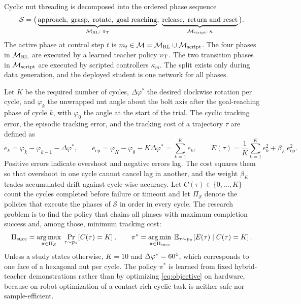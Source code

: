 Cyclic nut threading is decomposed into the ordered phase sequence
\begin{equation}\label{eq:phases}
  \mathcal{S}=\big(\underbrace{\text{approach},\;\text{grasp},\;\text{rotate},\;\text{goal reaching}}_{\mathcal{M}_{\mathrm{RL}}:\;\pi_{\mathrm{T}}},\;\underbrace{\text{release},\;\text{return and reset}}_{\mathcal{M}_{\mathrm{script}}:\;\kappa}\big).
\end{equation}
The active phase at control step $t$ is $m_t\in\mathcal{M}=\mathcal{M}_{\mathrm{RL}}\cup\mathcal{M}_{\mathrm{script}}$. The four phases in $\mathcal{M}_{\mathrm{RL}}$ are executed by a learned teacher policy $\pi_{\mathrm{T}}$. The two transition phases in $\mathcal{M}_{\mathrm{script}}$ are executed by scripted controllers $\kappa_m$. The split exists only during data generation, and the deployed student is one network for all phases.

Let $K$ be the required number of cycles, $\Delta\varphi^{*}$ the desired clockwise rotation per cycle, and $\varphi_k$ the unwrapped nut angle about the bolt axis after the goal-reaching phase of cycle $k$, with $\varphi_0$ the angle at the start of the trial. The cyclic tracking error, the episodic tracking error, and the tracking cost of a trajectory $\tau$ are defined as
\begin{equation}\label{eq:errors}
  e_k=\varphi_k-\varphi_{k-1}-\Delta\varphi^{*},\qquad
  e_{\mathrm{ep}}=\varphi_K-\varphi_0-K\Delta\varphi^{*}=\sum_{k=1}^{K}e_k,\qquad
  E(\tau)=\frac{1}{K}\sum_{k=1}^{K}e_k^{2}+\beta_{E}\,e_{\mathrm{ep}}^{2}.
\end{equation}
Positive errors indicate overshoot and negative errors lag. The cost squares them so that overshoot in one cycle cannot cancel lag in another, and the weight $\beta_E$ trades accumulated drift against cycle-wise accuracy. Let $C(\tau)\in\{0,\dots,K\}$ count the cycles completed before failure or timeout and let $\Pi_{\mathcal{S}}$ denote the policies that execute the phases of $\mathcal{S}$ in order in every cycle. The research problem is to find the policy that chains all phases with maximum completion success and, among those, minimum tracking cost:
\begin{equation}\label{eq:objective}
  \Pi_{\mathrm{succ}}=\argmax_{\pi\in\Pi_{\mathcal{S}}}\;\Pr_{\tau\sim p_\pi}\!\left[C(\tau)=K\right],\qquad
  \pi^{*}=\argmin_{\pi\in\Pi_{\mathrm{succ}}}\;\E_{\tau\sim p_\pi}\!\left[E(\tau)\mid C(\tau)=K\right].
\end{equation}
Unless a study states otherwise, $K=10$ and $\Delta\varphi^{*}=60^\circ$, which corresponds to one face of a hexagonal nut per cycle. The policy $\pi^{*}$ is learned from fixed hybrid-teacher demonstrations rather than by optimizing \eqref{eq:objective} on hardware, because on-robot optimization of a contact-rich cyclic task is neither safe nor sample-efficient.

